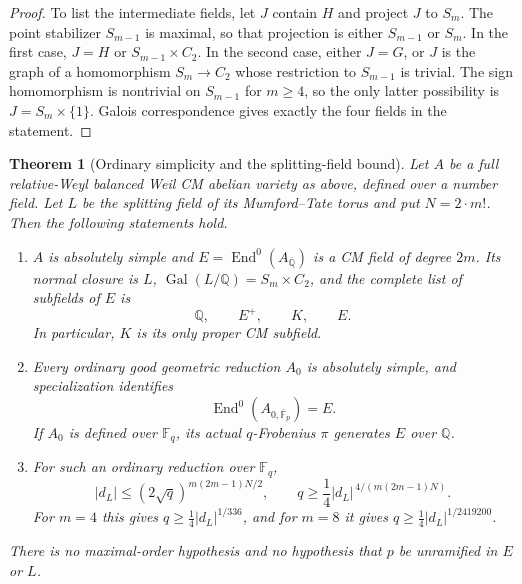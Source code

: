 \documentclass[11pt]{article}
\newtheorem{theorem}{Theorem}[section]
\theoremstyle{definition}
\theoremstyle{remark}
\begin{document}
\begin{proof}
To list the intermediate fields, let $J$ contain $H$ and project
$J$ to $S_m$.  The point stabilizer $S_{m-1}$ is maximal, so that
projection is either $S_{m-1}$ or $S_m$.  In the first case,
$J=H$ or $S_{m-1}\times C_2$.  In the second case, either $J=G$,
or $J$ is the graph of a homomorphism $S_m\to C_2$ whose restriction
to $S_{m-1}$ is trivial.  The sign homomorphism is nontrivial on
$S_{m-1}$ for $m\geq4$, so the only latter possibility is
$J=S_m\times\{1\}$.  Galois correspondence gives exactly the four
fields in the statement.

\end{proof}

\begin{theorem}[Ordinary simplicity and the splitting-field bound]
\label{thm:weyl-ordinary-rigidity}
Let $A$ be a full relative-Weyl balanced Weil CM abelian variety as
above, defined over a number field.  Let $L$ be the splitting field
of its Mumford--Tate torus and put $N=2\cdot m!$.
Then the following statements hold.
\begin{enumerate}
\item
$A$ is absolutely simple and
$E=\operatorname{End}^0(A_{\overline{\mathbb Q}})$ is a CM field of
degree $2m$.  Its normal closure is $L$,
$\operatorname{Gal}(L/\mathbb Q)=S_m\times C_2$, and the complete
list of subfields of $E$ is
\[
 \mathbb Q,\qquad E^+,\qquad K,\qquad E.
\]
In particular, $K$ is its only proper CM subfield.
\item
Every ordinary good geometric reduction $A_0$ is absolutely simple,
and specialization identifies
\[
 \operatorname{End}^0(A_{0,\overline{\mathbb F}_p})=E.
\]
If $A_0$ is defined over $\mathbb F_q$, its actual $q$-Frobenius
$\pi$ generates $E$ over $\mathbb Q$.
\item
For such an ordinary reduction over $\mathbb F_q$,
\begin{equation}
 \label{eq:weyl-ordinary-q-bound}
 |d_L|\leq(2\sqrt q)^{m(2m-1)N/2},
 \qquad
 q\geq\frac14 |d_L|^{\,4/(m(2m-1)N)}.
\end{equation}
For $m=4$ this gives $q\geq\tfrac14|d_L|^{1/336}$, and for
$m=8$ it gives $q\geq\tfrac14|d_L|^{1/2419200}$.
\end{enumerate}
There is no maximal-order hypothesis and no hypothesis that $p$ be
unramified in $E$ or $L$.
\end{theorem}
\end{document}
